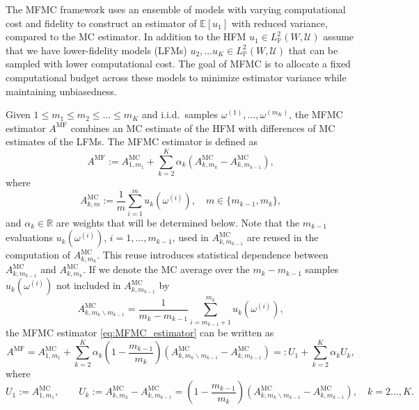 The MFMC framework uses an ensemble of models with varying computational cost and fidelity 
to construct an estimator of $\mathbb{E}[u_1 ]$ with reduced variance, compared to the MC estimator.
In addition to the HFM $u_1 \in   L_{\mathbb{P}}^2(W, {\mathcal U})$ assume that we have lower-fidelity models (LFMs)
$u_2, \ldots u_K \in   L_{\mathbb{P}}^2(W, {\mathcal U})$ that can be sampled with lower computational cost.
The goal of MFMC is to allocate a fixed computational budget across these models to minimize estimator variance while maintaining unbiasedness.

Given $1 \le m_1 \le m_2 \le \ldots \le m_K$ and i.i.d.\ samples $\omega^{(1)}, \ldots, \omega^{(m_K)}$,
the MFMC estimator $A^{\text{MF}}$ combines an MC estimate of the HFM with differences 
of MC estimates of the LFMs.
The MFMC estimator is defined as
\begin{equation}\label{eq:MFMC_estimator}
    A^{\text{MF}}
     := A^{\text{MC}}_{1,m_1} + \sum_{k=2}^K \alpha_k\left(A^{\text{MC}}_{k,m_k} - A^{\text{MC}}_{k,m_{k-1}} \right),
\end{equation}
where
\begin{equation}\label{eq:MFMC_estimator_MCk}
     A^{\text{MC}}_{k,m} :=  \frac{1}{m} \sum_{i=1}^m   u_k(\omega^{(i)}), \quad m \in \{ m_{k-1}, m_k \},
\end{equation}
and $\alpha_k\in \mathbb{R}$ are weights that will be determined below.
Note that the $m_{k-1}$ evaluations $u_k(\omega^{(i)})$, $i = 1, \ldots,  m_{k-1}$,
used in  $A^{\text{MC}}_{k,m_{k-1}}$ are reused in  the computation of $A^{\text{MC}}_{k,m_k}$.
This reuse introduces statistical dependence between 
$A^{\text{MC}}_{k,m_{k-1}}$ and $A^{\text{MC}}_{k,m_k}$. 
If we denote the MC average over the $m_k - m_{k-1}$ samples $u_k(\omega^{(i)})$ 
not included in $A^{\text{MC}}_{k,m_{k-1}}$ by
\[
     A^{\text{MC}}_{k,m_k \backslash m_{k-1}}
      =  \frac{1}{m_k-m_{k-1}}  \sum_{i=m_{k-1}+1}^{m_k}   u_k(\omega^{(i)}), 
\]
the MFMC estimator \eqref{eq:MFMC_estimator} can be written as
\begin{equation}\label{eq:MFMC_estimator_independent}
    A^{\text{MF}} 
    = A^{\text{MC}}_{1,m_1} 
      +  \sum_{k=2}^K \alpha_k\left(1-\frac{m_{k-1}}{m_k}\right)
                               \left(A_{k,m_k\backslash m_{k-1}}^{\text{MC}}-A_{k,m_{k-1}}^{\text{MC}}\right)
   =: U_1 + \sum_{k=2}^K \alpha_k U_k,
\end{equation}
where
\begin{equation} \label{eq:MFMC_Yk}
       U_1 := A^{\text{MC}}_{1,m_1},\qquad 
       U_k := A^{\text{MC}}_{k,m_k} - A^{\text{MC}}_{k,m_{k-1}}
               =\left(1-\frac{m_{k-1}}{m_k}\right)
                 \left(A_{k,m_k\backslash m_{k-1}}^{\text{MC}}-A_{k,m_{k-1}}^{\text{MC}}\right), \quad k=2\ldots, K.
\end{equation}
